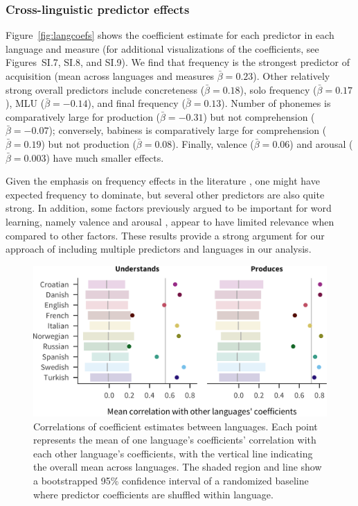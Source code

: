 \documentclass[manuscript]{stjour}
\begin{document}
\subsubsection{Cross-linguistic predictor effects}

Figure~\ref{fig:langcoefs} shows the coefficient estimate for each
predictor in each language and measure (for additional visualizations of
the coefficients, see Figures~SI.7, SI.8, and SI.9). We find that
frequency is the strongest predictor of acquisition (mean across
languages and measures \(\bar{\beta} = 0.23\)). Other relatively strong
overall predictors include concreteness (\(\bar{\beta} = 0.18\)), solo
frequency (\(\bar{\beta} = 0.17\)), MLU (\(\bar{\beta} = -0.14\)), and
final frequency (\(\bar{\beta} = 0.13\)). Number of phonemes is
comparatively large for production (\(\bar{\beta} = -0.31\)) but not
comprehension (\(\bar{\beta} = -0.07\)); conversely, babiness is
comparatively large for comprehension (\(\bar{\beta} = 0.19\)) but not
production (\(\bar{\beta} = 0.08\)). Finally, valence
(\(\bar{\beta} = 0.06\)) and arousal (\(\bar{\beta} = 0.003\)) have much
smaller effects.

Given the emphasis on frequency effects in the literature
\citep{ambridge2015}, one might have expected frequency to dominate, but
several other predictors are also quite strong. In addition, some
factors previously argued to be important for word learning, namely
valence and arousal \citep{moors2013}, appear to have limited relevance
when compared to other factors. These results provide a strong argument
for our approach of including multiple predictors and languages in our
analysis.

\begin{figure}

{\centering \includegraphics[width=\textwidth]{consistency-1}

}

\caption{Correlations of coefficient estimates between languages. Each point represents the mean of one language's coefficients' correlation with each other language's coefficients, with the vertical line indicating the overall mean across languages. The shaded region and line show a bootstrapped 95\% confidence interval of a randomized baseline where predictor coefficients are shuffled within language.}\label{fig:consistency}
\end{figure}
\end{document}
